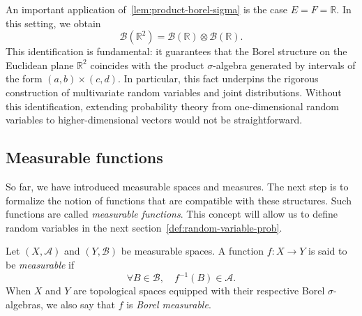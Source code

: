 \begin{remarknl}
    An important application of~\ref{lem:product-borel-sigma} is the case $E = F = \mathbb{R}$. In this setting, we obtain
    \[
        \mathcal{B}(\mathbb{R}^2) = \mathcal{B}(\mathbb{R}) \otimes \mathcal{B}(\mathbb{R}).
    \]
    This identification is fundamental: it guarantees that the Borel structure on the Euclidean plane $\mathbb{R}^2$ coincides with the product $\sigma$-algebra generated by intervals of the form $(a, b) \times (c, d)$. In particular, this fact underpins the rigorous construction of multivariate random variables and joint distributions. Without this identification, extending probability theory from one-dimensional random variables to higher-dimensional vectors would not be straightforward.
\end{remarknl}

\subsection{Measurable functions}\label{subsec:measurable-functions}

So far, we have introduced measurable spaces and measures. The next step is to formalize the notion of functions that are compatible with these structures. Such functions are called \emph{measurable functions}. This concept will allow us to define random variables in the next section~\ref{def:random-variable-prob}.

\begin{definition}
    \label{def:measurable-function}
    Let $(X, \mathcal{A})$ and $(Y, \mathcal{B})$ be measurable spaces. A function $f : X \to Y$ is said to be \emph{measurable} if
    \[
        \forall B \in \mathcal{B}, \quad f^{-1}(B) \in \mathcal{A}.
    \]
    When $X$ and $Y$ are topological spaces equipped with their respective Borel $\sigma$-algebras, we also say that $f$ is \emph{Borel measurable}.
\end{definition}


